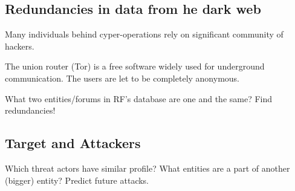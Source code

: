 \subsection{Redundancies in data from he dark web}
Many individuals behind cyper-operations rely on significant community of hackers. 

The union router (Tor) is a free software widely used for underground communication. The users are let to be completely anonymous. 

What two entities/forums in RF’s database are one and the same? Find redundancies!

\subsection{Target and Attackers}
Which threat actors have similar profile? 
What entities are a part of another (bigger) entity?
Predict future attacks.


\newpage 
